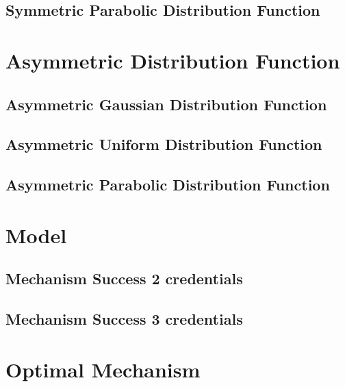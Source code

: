 \documentclass{article}
\begin{document}
\subsection{Symmetric Parabolic Distribution Function}
\section{Asymmetric Distribution Function}
\subsection{Asymmetric Gaussian Distribution Function}
\subsection{Asymmetric Uniform Distribution Function}
\subsection{Asymmetric Parabolic Distribution Function}
\section{Model}
\subsection{Mechanism Success 2 credentials}
\subsection{Mechanism Success 3 credentials}
\section{Optimal Mechanism}
\end{document}
